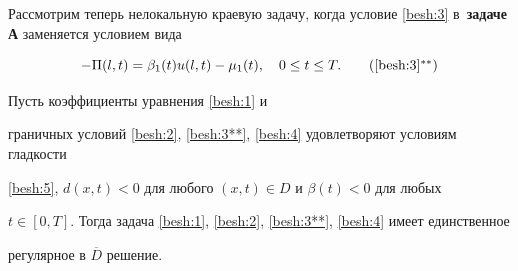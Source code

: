 \smallskip




Рассмотрим теперь нелокальную краевую задачу, когда условие \eqref{besh:3} в~\textbf{задаче А} заменяется условием вида

\begin{equation}

-\Pi(l,t)=\beta_{1}(t) u(l,t)-\mu_{1}(t), \quad 0 \leq t\leq T.

\tag{\ref{besh:3}$^{**}$}

\label{besh:3**}

\end{equation}







\begin{theorem}[3] Пусть коэффициенты уравнения \eqref{besh:1} и

граничных условий \eqref{besh:2}{\rm ,} \eqref{besh:3**}{\rm ,} \eqref{besh:4}  удовлетворяют условиям гладкости

\eqref{besh:5}{\rm ,} $d(x,t)<0$ для любого $(x,t) \in D$ и $\beta(t)<0 $ для любых

$t \in [0,T].$ Тогда задача \eqref{besh:1}{\rm ,} \eqref{besh:2}{\rm ,} \eqref{besh:3**}{\rm ,} \eqref{besh:4} имеет единственное

регулярное в $\overline{D}$ решение{\rm .}

\end{theorem}



\smallskip



